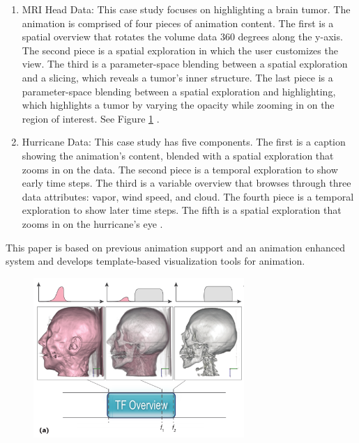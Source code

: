 \documentclass{egpubl}
\begin{document}
\begin{enumerate}
\item MRI Head Data: This case study focuses on highlighting a brain tumor. The animation is comprised of four pieces of animation content. The first is a spatial overview that rotates the volume data 360 degrees along the y-axis. The second piece is a spatial exploration in which the user customizes the view. The third is a parameter-space blending between a spatial exploration and a slicing, which reveals a tumor's inner structure.  The last piece is a parameter-space blending between a spatial exploration and highlighting, which highlights a tumor by varying the opacity while zooming in on the region of interest. See Figure \ref{fig:AniVis} \cite{Akiba}.
\item Hurricane Data: This case study  has five components. The first is a caption showing the animation's content, blended with a spatial exploration that zooms in on the data. The second piece is a temporal exploration to show early time steps. The third is a variable overview that browses through three data attributes: vapor, wind speed, and cloud. The fourth piece is a temporal exploration to show later time steps. The fifth is a spatial exploration that zooms in on the hurricane's eye \cite{Akiba}.
\end{enumerate}
This paper is based on previous animation support \cite{childs} and an animation enhanced system \cite{correa} and develops  template-based visualization tools for animation. 

\begin{figure}
\begingroup
\centering
\includegraphics[width=8cm]{./images/AniVis}
\label{fig:AniVis}
\endgroup
\end{figure}
\end{document}
